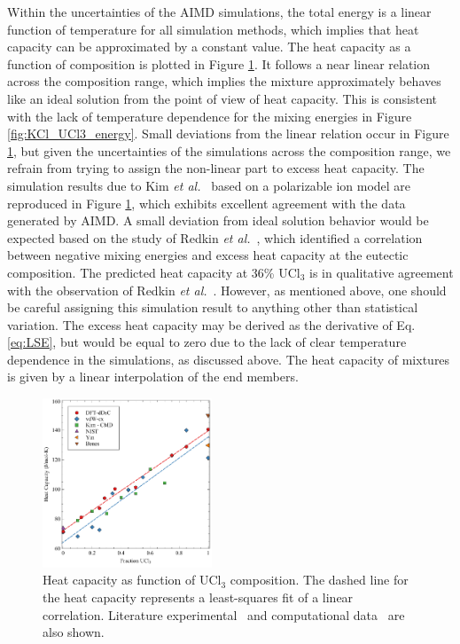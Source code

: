 \documentclass[preprint,3p,10pt,number,sort&compress]{elsarticle}
\begin{document}
Within the uncertainties of the AIMD simulations, the total energy is a linear function of temperature for all simulation methods, which implies that heat capacity can be approximated by a constant value. The heat capacity as a function of composition is plotted in Figure \ref{fig:heat_capacity}. It follows a near linear relation across the composition range, which implies the mixture approximately behaves like an ideal solution from the point of view of heat capacity. This is consistent with the lack of temperature dependence for the mixing energies in Figure \ref{fig:KCl_UCl3_energy}. Small deviations from the linear relation occur in Figure \ref{fig:heat_capacity}, but given the uncertainties of the simulations across the composition range, we refrain from trying to assign the non-linear part to excess heat capacity. The simulation results due to Kim \textit{et al.}~\cite{Kim} based on a polarizable ion model are reproduced in Figure \ref{fig:heat_capacity}, which exhibits excellent agreement with the data generated by AIMD. A small deviation from ideal solution behavior would be expected based on the study of Redkin \textit{et al.}~\cite{Redkin}, which identified a correlation between negative mixing energies and excess heat capacity at the eutectic composition. The predicted heat capacity at 36\% UCl$_3$ is in qualitative agreement with the observation of Redkin \textit{et al.}~\cite{Redkin}. However, as mentioned above, one should be careful assigning this simulation result to anything other than statistical variation. The excess heat capacity may be derived as the derivative of Eq. \ref{eq:LSE}, but would be equal to zero due to the lack of clear temperature dependence in the simulations, as discussed above. The heat capacity of mixtures is given by a linear interpolation of the end members. 

\begin{figure}[h!]
\centering
\includegraphics[width=0.45\textwidth]{ben_fig3.pdf}
\caption{Heat capacity as function of UCl$_3$ composition. The dashed line for the heat capacity represents a least-squares fit of a linear correlation. Literature experimental~\cite{NIST,219851,YIN2020,BENES2008} and computational data~\cite{Kim} are also shown.}
\label{fig:heat_capacity}
\end{figure}
\end{document}
